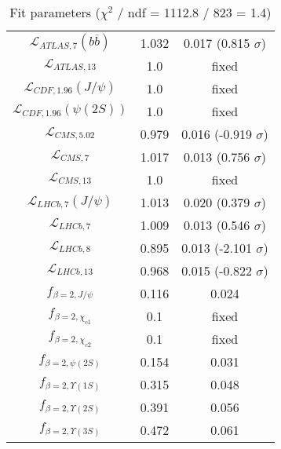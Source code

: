 \begin{table}[h!]
\begin{tabular}{c|c|c}
$\mathcal L_{ATLAS,7}(b\overline b)$ & 1.032 & 0.017 (0.815 $\sigma$) \\
$\mathcal L_{ATLAS,13}$ & 1.0 & fixed \\
$\mathcal L_{CDF,1.96}(J/\psi)$ & 1.0 & fixed \\
$\mathcal L_{CDF,1.96}(\psi(2S))$ & 1.0 & fixed \\
$\mathcal L_{CMS,5.02}$ & 0.979 & 0.016 (-0.919 $\sigma$) \\
$\mathcal L_{CMS,7}$ & 1.017 & 0.013 (0.756 $\sigma$) \\
$\mathcal L_{CMS,13}$ & 1.0 & fixed \\
$\mathcal L_{LHCb,7}(J/\psi)$ & 1.013 & 0.020 (0.379 $\sigma$) \\
$\mathcal L_{LHCb,7}$ & 1.009 & 0.013 (0.546 $\sigma$) \\
$\mathcal L_{LHCb,8}$ & 0.895 & 0.013 (-2.101 $\sigma$) \\
$\mathcal L_{LHCb,13}$ & 0.968 & 0.015 (-0.822 $\sigma$) \\
$f_{\beta=2,J/\psi}$ & 0.116 & 0.024 \\
$f_{\beta=2,\chi_{c1}}$ & 0.1 & fixed \\
$f_{\beta=2,\chi_{c2}}$ & 0.1 & fixed \\
$f_{\beta=2,\psi(2S)}$ & 0.154 & 0.031 \\
$f_{\beta=2,\Upsilon(1S)}$ & 0.315 & 0.048 \\
$f_{\beta=2,\Upsilon(2S)}$ & 0.391 & 0.056 \\
$f_{\beta=2,\Upsilon(3S)}$ & 0.472 & 0.061 \\
\end{tabular}
\caption{Fit parameters ($\chi^2$ / ndf = 1112.8 / 823 = 1.4)}
\end{table}

